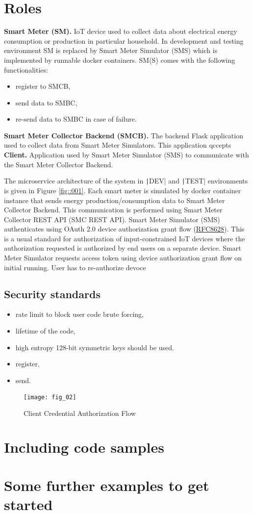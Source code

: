 \documentclass{ol-softwaremanual}
\begin{document}
\section{Roles}
\noindent \textbf{Smart Meter (SM).} IoT device used to collect data about electrical energy consumption or production in particular household. In development and testing environment SM is replaced by Smart Meter Simulator (SMS) which is implemented by runnable docker containers. SM(S) comes with the following functionalities:
\begin{itemize}
    \item register to SMCB,
    \item send data to SMBC,
    \item re-send data to SMBC in case of failure.
\end{itemize}
\noindent \textbf{Smart Meter Collector Backend (SMCB).} The backend Flask application used to collect data from Smart Meter Simulators. This application qccepts 
\noindent \textbf{Client.} Application used by Smart Meter Simulator (SMS) to communicate with the Smart Meter Collector Backend.

The microservice architecture of the system in \texttt|DEV| and \texttt|TEST| environments is given in Figure \ref{fig::001}. Each smart meter is simulated by docker container instance that sends energy production/consumption data to Smart Meter Collector Backend. This communication is performed using Smart Meter Collector REST API (SMC REST API). Smart Meter Simulator (SMS) authenticates using OAuth 2.0 device authorization grant flow (\href{https://www.rfc-editor.org/rfc/rfc8628}{RFC8628}). This is a usual standard for authorization of input-constrained IoT devices where the authorization requested is authorized by end users on a separate device. Smart Meter Simulator requests access token using device authorization grant flow on initial running. User has to re-authorize devoce 

\subsection{Security standards}
\begin{itemize}
    \item rate limit to block user code brute forcing,
    \item lifetime of the code,
    \item high entropy 128-bit symmetric keys should be used.
\end{itemize}
\begin{itemize}
    \item register,
    \item send.
\end{itemize}


\begin{figure}
    \centering
    \texttt{[image: fig\_02]}
    \caption{Client Credential Authorization Flow}\label{fig::002}
\end{figure}

\section{Including code samples}

%

\section{Some further examples to get started}

%
\end{document}
